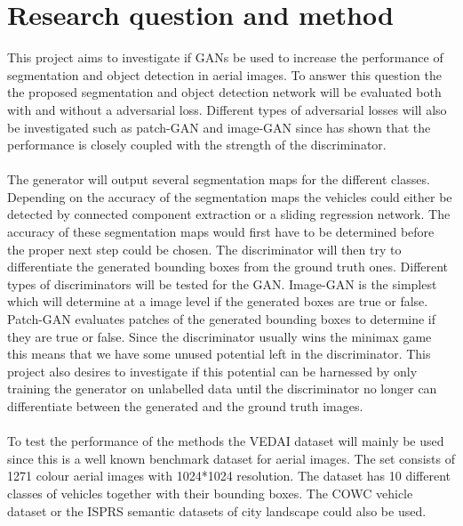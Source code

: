 \documentclass[a4paper,11pt]{article}
\begin{document}
\section{Research question and method} 
This project aims to investigate if GANs be used to increase the performance of segmentation and object detection in aerial images. To answer this question the the proposed segmentation and object detection network will be evaluated both with and without a adversarial loss. Different types of adversarial losses will also be investigated such as patch-GAN and image-GAN since \cite{son_retinal_2017} has shown that the performance is closely coupled with the strength of the discriminator.\\
\\
The generator will output several segmentation maps for the different classes. Depending on the accuracy of the segmentation maps the vehicles could either be detected by connected component extraction or a sliding regression network. The accuracy of these segmentation maps would first have to be determined before the proper next step could be chosen. The discriminator will then try to differentiate the generated bounding boxes from the ground truth ones. Different types of discriminators will be tested for the GAN. Image-GAN is the simplest which will determine at a image level if the generated boxes are true or false. Patch-GAN evaluates patches of the generated bounding boxes to determine if they are true or false.  Since the discriminator usually wins the minimax game this means that we have some unused potential left in the discriminator. This project also desires to investigate if this potential can be harnessed by only training the generator on unlabelled data until the discriminator no longer can differentiate between the generated and the ground truth images.\\
\\
To test the performance of the methods the VEDAI dataset \cite{razakarivony_vehicle_2015} will mainly be used since this is a well known benchmark dataset for aerial images. The set consists of 1271 colour aerial images with 1024*1024 resolution. The dataset has 10 different classes of vehicles together with their bounding boxes. The COWC vehicle dataset \nocite{mundhenk_cars_nodate} or the ISPRS semantic datasets of city landscape \cite{noauthor_2d_nodate} could also be used.
\end{document}
